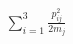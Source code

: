 \documentclass[preview]{standalone}
\begin{document}
\begin{align*}
\sum_{i=1}^3\frac{p_{ij}^2}{2m_j}
\end{align*}
\end{document}
